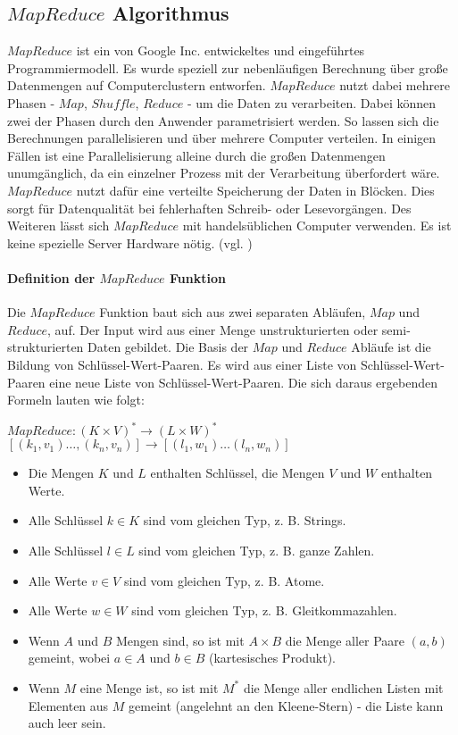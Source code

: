 \subsection{$MapReduce$ Algorithmus}
$MapReduce$ ist ein von Google Inc. entwickeltes und eingeführtes Programmiermodell. Es wurde speziell zur nebenläufigen Berechnung über große Datenmengen auf Computerclustern entworfen. $MapReduce$ nutzt dabei mehrere Phasen - $Map$, $Shuffle$, $Reduce$ - um die Daten zu verarbeiten. Dabei können zwei der Phasen durch den Anwender parametrisiert werden. So lassen sich die Berechnungen parallelisieren und über mehrere Computer verteilen. In einigen Fällen ist eine Parallelisierung alleine durch die großen Datenmengen unumgänglich, da ein einzelner Prozess mit der Verarbeitung überfordert wäre.\\ $MapReduce$ nutzt dafür eine verteilte Speicherung der Daten in Blöcken. Dies sorgt für Datenqualität bei fehlerhaften Schreib- oder Lesevorgängen. Des Weiteren lässt sich $MapReduce$ mit handelsüblichen Computer verwenden. Es ist keine spezielle Server Hardware nötig. (vgl. \cite{wik15})

\paragraph{Definition der $MapReduce$ Funktion}$\;$ \\
Die $MapReduce$ Funktion baut sich aus zwei separaten Abläufen, $Map$ und $Reduce$, auf. Der Input wird aus einer Menge unstrukturierten oder semi-strukturierten Daten gebildet. Die Basis der $Map$ und $Reduce$ Abläufe ist die Bildung von Schlüssel-Wert-Paaren. Es wird aus einer Liste von Schlüssel-Wert-Paaren eine neue Liste von Schlüssel-Wert-Paaren. Die sich daraus ergebenden Formeln lauten wie folgt:

\begin{center}
    $MapReduce: (K \times V)^\ast \rightarrow (L \times W)^\ast$\\$[(k_1, v_1) \dots ,(k_n, v_n)] \rightarrow [(l_1, w_1) \dots (l_n, w_n)]$
\end{center}
\begin{itemize}
    \item Die Mengen $K$ und $L$ enthalten Schlüssel, die Mengen $V$ und $W$ enthalten Werte.
    \item Alle Schlüssel $k \in K$ sind vom gleichen Typ, z. B. Strings.
    \item Alle Schlüssel $l \in L$ sind vom gleichen Typ, z. B. ganze Zahlen.
    \item Alle Werte $v \in V$ sind vom gleichen Typ, z. B. Atome.
    \item Alle Werte $w \in W$ sind vom gleichen Typ, z. B. Gleitkommazahlen.
    \item Wenn $A$ und $B$ Mengen sind, so ist mit $A\times B$ die Menge aller Paare $(a, b)$ gemeint, wobei $a \in A$ und $b \in B$ (kartesisches Produkt).
    \item Wenn $M$ eine Menge ist, so ist mit $M^*$ die Menge aller endlichen Listen mit Elementen aus $M$ gemeint (angelehnt an den Kleene-Stern) - die Liste kann auch leer sein.
\end{itemize}

